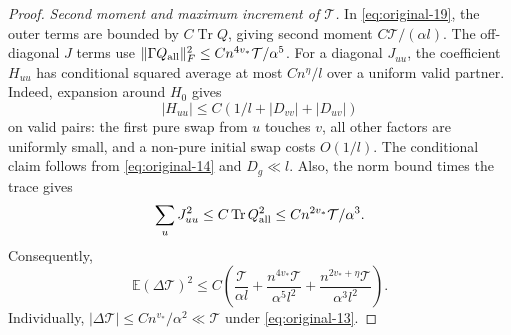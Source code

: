 \begin{proof}
\emph{Second moment and maximum increment of \(\mathcal T\).}
In \eqref{eq:original-19}, the outer terms are bounded by
\(C\operatorname{Tr}Q\), giving second moment
\(C\mathcal T/(\alpha l)\). The off-diagonal \(J\) terms use
\(\|\Gamma Q_{\rm all}\|_F^2\le
Cn^{4v_*}\mathcal T/\alpha^5\).
For a diagonal \(J_{uu}\), the coefficient \(H_{uu}\) has
conditional squared average at most \(Cn^\eta/l\) over a uniform
valid partner. Indeed, expansion around \(H_0\) gives
\begin{equation}
 |H_{uu}|\le C(1/l+|D_{vv}|+|D_{uv}|)
\label{eq:original-21}
\end{equation}
on valid pairs: the first pure swap from \(u\) touches \(v\),
all other factors are uniformly small, and a non-pure initial swap
costs \(O(1/l)\). The conditional claim follows from
\eqref{eq:original-14} and \(D_g\ll l\). Also, the norm bound
times the trace gives
\[
 \sum_u J_{uu}^2\le C\operatorname{Tr}Q_{\rm all}^2
       \le Cn^{2v_*}\mathcal T/\alpha^3.
\]
Consequently,
\begin{equation}
 \mathbb E(\Delta\mathcal T)^2\le C\left(\frac{\mathcal T}{\alpha l}+
       \frac{n^{4v_*}\mathcal T}{\alpha^5 l^2}
       +\frac{n^{2v_*+\eta}\mathcal T}{\alpha^3 l^2}\right).
\label{eq:early-T-variance}
\end{equation}
Individually, \(\lvert\Delta\mathcal T\rvert\le
Cn^{v_*}/\alpha^2\ll\mathcal T\) under
\eqref{eq:original-13}.
\end{proof}

